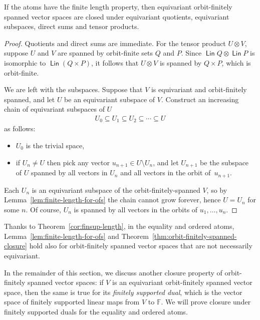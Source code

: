 \documentclass{theoretics}
\DeclareMathOperator{\lin}{\mathsf{Lin}}
\newcommand{\field}{\mathbb F}
\begin{document}
\begin{theorem}\label{thm:orbit-finitely-spanned-closure}
If the atoms have the finite length property, then
equivariant orbit-finitely spanned vector spaces  are closed under equivariant quotients, equivariant subspaces, direct sums and tensor products.
\end{theorem}
\begin{proof}
   Quotients and direct sums are immediate.  For the tensor product $U \otimes V$, suppose $U$ and $V$ are spanned by orbit-finite sets $Q$ and $P$.
   Since  $\lin Q \otimes \lin P$ is isomorphic to $\lin (Q \times P)$, it follows that  $U \otimes V$ is spanned by $Q \times P$, which is orbit-finite. 
   
   We are left with the subspaces. Suppose that $V$ is equivariant and orbit-finitely spanned, and let $U$ be an equivariant subspace of $V$. Construct an increasing chain of equivariant subspaces of $U$ \begin{align*}
    U_0\subseteq U_1 \subseteq U_2 \subseteq \cdots \subseteq U
    \end{align*} 
as follows:
\begin{itemize}
\item $U_0$ is the trivial space,
\item if $U_n\neq U$ then pick any vector $u_{n+1}\in U\setminus U_n$, and let $U_{n+1}$ be the subspace of $U$ spanned by all vectors in $U_n$ and all vectors in the orbit of~$u_{n+1}$.
\end{itemize}   
Each $U_n$ is an equivariant subspace of the orbit-finitely-spanned $V$, so by Lemma~\ref{lem:finite-length-for-ofs} the chain cannot grow forever, hence $U=U_n$ for some $n$. Of course, $U_n$ is spanned by all vectors in the orbits of $u_1,\ldots,u_n$.
\end{proof}

Thanks to Theorem~\ref{cor:finsup-length}, in the equality and ordered atoms,  Lemma~\ref{lem:finite-length-for-ofs} and Theorem~\ref{thm:orbit-finitely-spanned-closure} hold also for orbit-finitely spanned vector spaces that are  not necessarily equivariant.

In the remainder of this section, we discuss another closure property of orbit-finitely spanned vector spaces: if $V$ is an equivariant orbit-finitely spanned vector space, then the same is true for its \emph{finitely supported dual}, which is the vector space of finitely supported linear maps from $V$ to $\field$. We will prove closure under finitely supported duals for the equality and ordered atoms.
\end{document}
